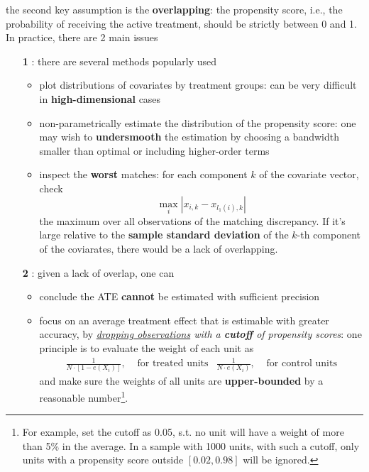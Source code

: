 \documentclass[twoside]{article}
\begin{document}
the second key assumption is the \textbf{overlapping}: the propensity score, i.e., the probability of receiving the active treatment, should be strictly between 0 and 1. In practice, there are 2 main issues
\begin{itemize}
    \item[\textbf{1}] : there are several methods popularly used
    \begin{itemize}
        \item plot distributions of covariates by treatment groups: can be very difficult in \textbf{high-dimensional} cases
        \item non-parametrically estimate the distribution of the propensity score: one may wish to \textbf{undersmooth} the estimation by choosing a bandwidth smaller than optimal or including higher-order terms
        \item inspect the \textbf{worst} matches: for each component $k$ of the covariate vector, check $$\max_i\left\vert x_{i,k} - x_{l_1(i),k} \right\vert$$
        the maximum over all observations of the matching discrepancy. If it's large relative to the \textbf{sample standard deviation} of the $k$-th component of the coviarates, there would be a lack of overlapping.
    \end{itemize}
    \item[\textbf{2}] : given a lack of overlap, one can 
    \begin{itemize}
        \item conclude the ATE \textbf{cannot} be estimated with sufficient precision 
        \item focus on an average treatment effect that is estimable with greater accuracy, by \textit{\underline{dropping observations} with a \textbf{cutoff} of propensity scores}: one principle is to evaluate the weight of each unit as
        \begin{align*}
            \frac{1}{N\cdot \left[1-e(X_i)\right]}, &\text{ for treated units} & \frac{1}{N\cdot e(X_i)}, &\text{ for control units}
        \end{align*}
        and make sure the weights of all units are \textbf{upper-bounded} by a reasonable number\footnote{For example, set the cutoff as 0.05, s.t. no unit will have a weight of more than 5\% in the average. In a sample with 1000 units, with such a cutoff, only units with a propensity score outside $[0.02,0.98]$ will be ignored.}.
    \end{itemize}

\end{itemize}
\end{document}
